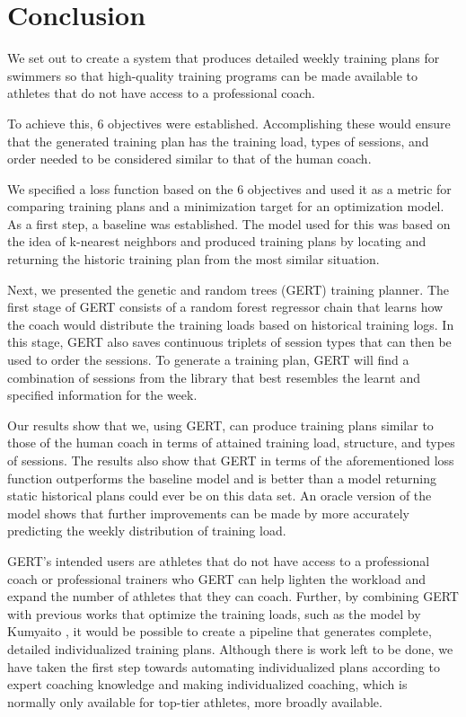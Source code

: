 \chapter{Conclusion}
We set out to create a system that produces detailed weekly training plans for swimmers so that high-quality training programs can be made available to athletes that do not have access to a professional coach. 

To achieve this, 6 objectives were established.
Accomplishing these would ensure that the generated training plan has the training load, types of sessions, and order needed to be considered similar to that of the human coach.

We specified a loss function based on the 6 objectives and used it as a metric for comparing training plans and a minimization target for an optimization model.
As a first step, a baseline was established.
The model used for this was based on the idea of k-nearest neighbors and produced training plans by locating and returning the historic training plan from the most similar situation.

Next, we presented the genetic and random trees (GERT) training planner.
The first stage of GERT consists of a random forest regressor chain that learns how the coach would distribute the training loads based on historical training logs. In this stage, GERT also saves continuous triplets of session types that can then be used to order the sessions.
To generate a training plan, GERT will find a combination of sessions from the library that best resembles the learnt and specified information for the week.

Our results show that we, using GERT, can produce training plans similar to those of the human coach in terms of attained training load, structure, and types of sessions.
The results also show that GERT in terms of the aforementioned loss function outperforms the baseline model and is better than a model returning static historical plans could ever be on this data set.
An oracle version of the model shows that further improvements can be made by more accurately predicting the weekly distribution of training load.

GERT's intended users are athletes that do not have access to a professional coach or professional trainers who GERT can help lighten the workload and expand the number of athletes that they can coach.
Further, by combining GERT with previous works that optimize the training loads, such as the model by Kumyaito \cite{kumyaito2018planning}, it would be possible to create a pipeline that generates complete, detailed individualized training plans.
Although there is work left to be done, we have taken the first step towards automating individualized plans according to expert coaching knowledge and making individualized coaching, which is normally only available for top-tier athletes, more broadly available.